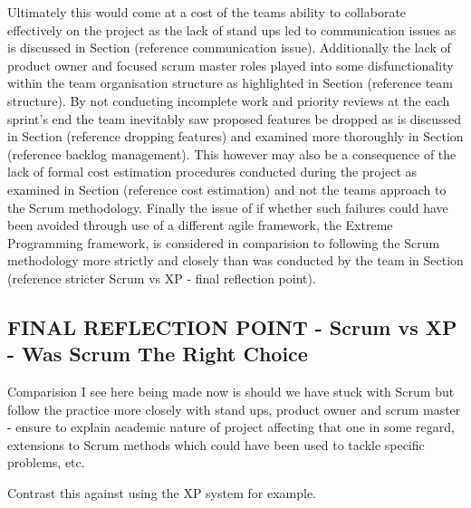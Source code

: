 \documentclass{l3proj}
\begin{document}
Ultimately this would come at a cost of the teams ability to collaborate effectively on the project as the lack of stand ups led to communication issues as is discussed in Section (reference communication issue). Additionally the lack of product owner and focused scrum master roles played into some disfunctionality within the team organisation structure as highlighted in Section (reference team structure). By not conducting incomplete work and priority reviews at the each sprint's end the team inevitably saw proposed features be dropped as is discussed in Section (reference dropping features) and examined more thoroughly in Section (reference backlog management). This however may also be a consequence of the lack of formal cost estimation procedures conducted during the project as examined in Section (reference cost estimation) and not the teams approach to the Scrum methodology. Finally the issue of if whether such failures could have been avoided through use of a different agile framework, the Extreme Programming framework, is considered in comparision to following the Scrum methodology more strictly and closely than was conducted by the team in Section (reference stricter Scrum vs XP - final reflection point).


\subsection{FINAL REFLECTION POINT - Scrum vs XP - Was Scrum The Right Choice}
\label{sec:scrumvsxp}

Comparision I see here being made now is should we have stuck with Scrum but follow the practice more closely with stand ups, product owner and scrum master - ensure to explain academic nature of project affecting that one in some regard, extensions to Scrum methods which could have been used to tackle specific problems, etc.

Contrast this against using the XP system for example.
\end{document}
